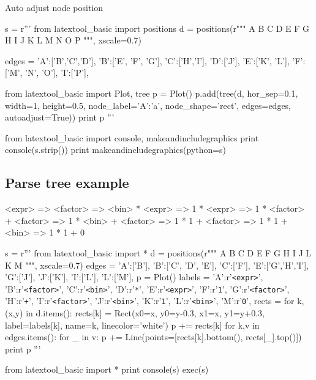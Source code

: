 \newpage
Auto adjust node position

\begin{python}
s = r'''
from latextool_basic import positions
d = positions(r"""
      A   
  B   C   D
E F G H   I J  
K L M N O P
""", xscale=0.7)

edges = {'A':['B','C','D'], 'B':['E', 'F', 'G'],
         'C':['H','I'],     'D':['J'],
         'E':['K', 'L'],    'F':['M', 'N', 'O'],
         'I':['P'],
}

from latextool_basic import Plot, tree
p = Plot()
p.add(tree(d,
           hor_sep=0.1,
           width=1, height=0.5, 
           node_label={'A':'a'},
           node_shape='rect',
           edges=edges,
           autoadjust=True))
print p
'''

from latextool_basic import console, makeandincludegraphics
print console(s.strip())
print makeandincludegraphics(python=s)
\end{python}


\newpage
\subsection{Parse tree example}

\begin{console}
<expr> => <factor>
       => <bin> * <expr>
       => 1 * <expr>
       => 1 * <factor> + <factor>
       => 1 * <bin> + <factor>
       => 1 * 1 + <factor>
       => 1 * 1 + <bin>
       => 1 * 1 + 0
\end{console}

\begin{python}
s = r'''
from latextool_basic import *
d = positions(r"""
   A
   B
C  D  E
F   G H I
    J   L
    K   M
""", xscale=0.7)
edges = {'A':['B'],          'B':['C', 'D', 'E'], 'C':['F'],
         'E':['G','H','I'],  'G':['J'],           'J':['K'],
         'I':['L'],          'L':['M'],
        }
p = Plot()
labels = {'A':r'\texttt{<expr>}',   'B':r'\texttt{<factor>}',
          'C':r'\texttt{<bin>}',    'D':r'\texttt{*}',
          'E':r'\texttt{<expr>}',   'F':r'\texttt{1}',
          'G':r'\texttt{<factor>}', 'H':r'\texttt{+}',
          'I':r'\texttt{<factor>}', 'J':r'\texttt{<bin>}',
          'K':r'\texttt{1}',        'L':r'\texttt{<bin>}',
          'M':r'\texttt{0}',
        }
rects = {}
for k,(x,y) in d.items():
    rects[k] = Rect(x0=x, y0=y-0.3, x1=x, y1=y+0.3, label=labels[k],
                    name=k, linecolor='white')
    p += rects[k]
for k,v in edges.items():
    for _ in v:
        p += Line(points=[rects[k].bottom(), rects[_].top()])
print p
'''

from latextool_basic import *
print console(s)
exec(s)
\end{python}


